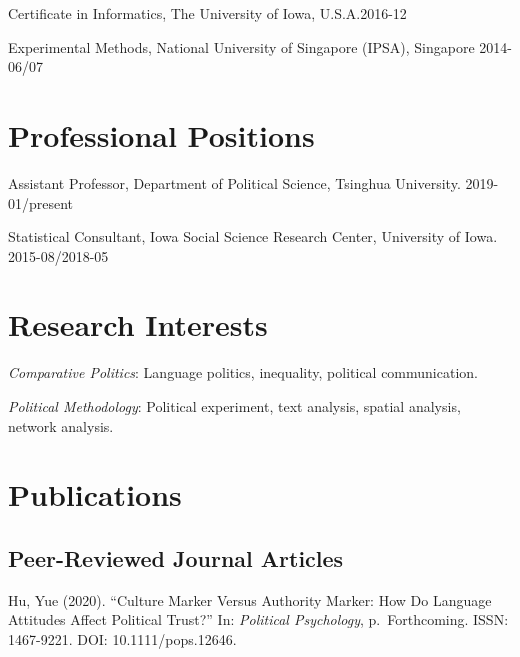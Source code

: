 \documentclass[10.5pt,]{article}
\providecommand{\tightlist}{%
	\setlength{\itemsep}{0pt}\setlength{\parskip}{0pt}}
\renewenvironment{itemize}{
	\begin{list}{}{
			\setlength{\leftmargin}{1.5em}
		}
	}{
	\end{list}
}
\begin{document}
\begin{itemize}
\tightlist
\item
  Certificate in Informatics, The University of Iowa,
  U.S.A.\hfill 2016-12
\item
  Experimental Methods, National University of Singapore (IPSA),
  Singapore \hfill 2014-06/07
\end{itemize}

\hypertarget{professional-positions}{%
\section{Professional Positions}\label{professional-positions}}

\begin{itemize}
\tightlist
\item
  Assistant Professor, Department of Political Science, Tsinghua
  University. \hfill 2019-01/present
\item
  Statistical Consultant, Iowa Social Science Research Center,
  University of Iowa. \hfill 2015-08/2018-05
\end{itemize}

\hypertarget{research-interests}{%
\section{Research Interests}\label{research-interests}}

\begin{itemize}
\tightlist
\item
  \emph{Comparative Politics}: Language politics, inequality, political
  communication.
\item
  \emph{Political Methodology}: Political experiment, text analysis,
  spatial analysis, network analysis.
\end{itemize}

\hypertarget{publications}{%
\section{Publications}\label{publications}}

\hypertarget{peer-reviewed-journal-articles}{%
\subsection{Peer-Reviewed Journal
Articles}\label{peer-reviewed-journal-articles}}

Hu, Yue (2020). ``Culture Marker Versus Authority Marker: How Do
Language Attitudes Affect Political Trust?'' In:
\emph{Political Psychology}, p.~Forthcoming. ISSN: 1467-9221. DOI:
10.1111/pops.12646.
\end{document}
